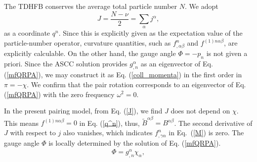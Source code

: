 \documentclass[11pt]{book} %
\begin{document}
The TDHFB conserves the average total particle number $N$.
We adopt 
\begin{equation}
	J = \frac{N-\nu}{2}=\sum_\alpha j^\alpha, 
  \label{J}
\end{equation}
as a coordinate $q^n$.
Since this is explicitly given as the expectation value of the particle-number
operator, curvature quantities,
such as $f^n_{,\alpha\beta}$ and $f^{(1)n\alpha\beta}$,
are explicitly calculable.
On the other hand, the gauge angle $\Phi=-p_n$ is not given a priori.
Since the ASCC solution provides $g^\alpha_{,n}$ as an eigenvector of
Eq. (\ref{mfQRPA}),
we may construct it as Eq. (\ref{coll_momenta}) in the first order
in $\pi=-\chi$.
We confirm that the pair rotation corresponds to an eigenvector
of Eq. (\ref{mfQRPA}) with the zero frequency $\omega^2=0$.



In the present pairing model, 
from Eq. (\ref{J}), we find $J$ does not depend on $\chi$.
This means $f^{(1)n\alpha\beta}=0$ in Eq. (\ref{q^n}),
thus, $\tilde{B}^{\alpha\beta}=B^{\alpha\beta}$.
The second derivative of $J$ with respect to $j$ also vanishes,
which indicates $f^n_{,\gamma\alpha}$ in Eq.~(\ref{M}) is zero. 
The gauge angle $\Phi$ is locally determined
by the solution of Eq. (\ref{mfQRPA}).
\begin{align}
\Phi = g^\alpha_{,n} \chi_{\alpha},
  \label{total_gauge}
\end{align}
\end{document}
